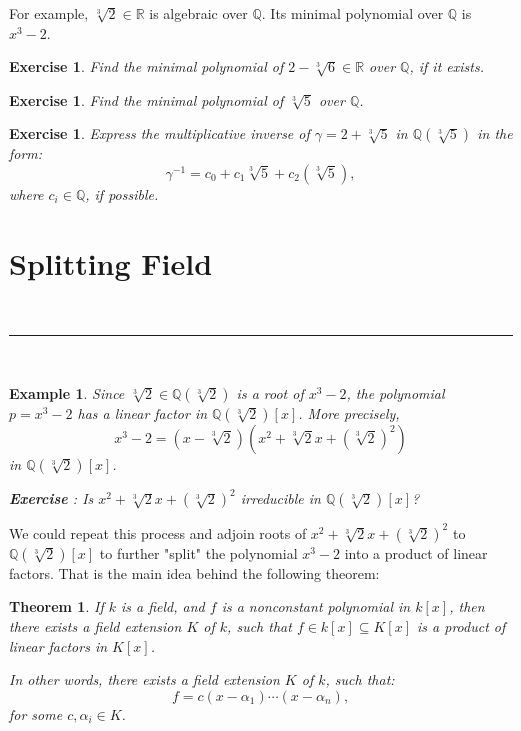 \documentclass[a4paper,12pt]{report}
\newcounter{statement}
\numberwithin{statement}{chapter}
\newtheorem{thm}[statement]{Theorem}
\newtheorem{eg}[statement]{\bf Example}
\newtheorem{ex}[statement]{\bf Exercise}
\numberwithin{equation}{chapter}
\numberwithin{section}{chapter}
\numberwithin{subsection}{section}
\begin{document}
For example, $\sqrt[3]{2} \in \mathbb{R}$ is algebraic over $\mathbb{Q}$.
Its minimal polynomial over $\mathbb{Q}$ is $x^3 - 2$.




\begin{ex}

Find the minimal polynomial of $2 - \sqrt[3]{6} \in \mathbb{R}$ over $\mathbb{Q}$, if it exists.
\end{ex}




\begin{ex}
Find the minimal polynomial of $\sqrt[3]{5}$ over $\mathbb{Q}$.
\end{ex}
\begin{ex}

Express the multiplicative inverse of $\gamma = 2 + \sqrt[3]{5}$
in $\mathbb{Q}(\sqrt[3]{5})$ in the form:
\[
\gamma^{-1} = c_0 + c_1\sqrt[3]{5} + c_2\left(\sqrt[3]{5}\right),
\]
where $c_i \in \mathbb{Q}$, if possible.
\end{ex}




\section{Splitting Field}


\quad\\\hrule
\quad\\

\begin{eg}
Since $\sqrt[3]{2} \in \mathbb{Q}(\sqrt[3]{2})$ is a root of $x^3 - 2$,
the polynomial $p = x^3 - 2$ has a linear factor in
$\mathbb{Q}(\sqrt[3]{2})[x]$.  More precisely,
\[
x^3 - 2 = (x - \sqrt[3]{2})(x^2 + \sqrt[3]{2}x + (\sqrt[3]{2})^2)
\]
in $\mathbb{Q}(\sqrt[3]{2})[x]$.

 {\bf Exercise} : Is $x^2 + \sqrt[3]{2}x + (\sqrt[3]{2})^2$
irreducible in $\mathbb{Q}(\sqrt[3]{2})[x]$?
\end{eg}

We could repeat this process and adjoin roots of
$x^2 + \sqrt[3]{2}x + (\sqrt[3]{2})^2$ to $\mathbb{Q}(\sqrt[3]{2})[x]$
to further "split" the polynomial $x^3 - 2$ into a product of linear factors.
That is the main idea behind the following theorem:

\begin{thm}


If $k$ is a field, and $f$ is a nonconstant polynomial in $k[x]$,
then there exists a field extension $K$ of $k$, such that $f \in k[x] \subseteq K[x]$
is a product of linear factors in $K[x]$.




In other words, there exists a field extension $K$ of $k$, such that:
\[
f = c(x - \alpha_1)\cdots (x - \alpha_n),
\]
for some $c, \alpha_i \in K$.

\end{thm}
\end{document}
